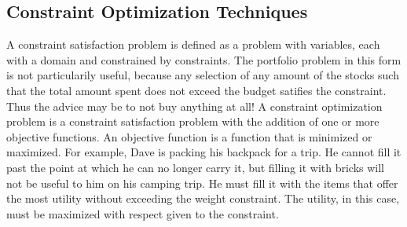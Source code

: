 \documentclass{article}
\begin{document}
    \subsection{Constraint Optimization Techniques}
    A constraint satisfaction problem is defined as a problem with variables, each with a domain and constrained by constraints. The portfolio
    problem in this form is not particularily useful, because any selection of any amount of the stocks such that the total amount spent does 
    not exceed the budget satifies the constraint. Thus the advice may be to not buy anything at all! A constraint optimization problem is a 
    constraint satisfaction problem with the addition of one or more objective functions. An objective function is a function that is minimized
    or maximized. For example, Dave is packing his backpack for a trip. He cannot fill it past the point at which he can no longer 
    carry it, but filling it with bricks will not be useful to him on his camping trip. He must fill it with the items that offer the most utility
    without exceeding the weight constraint. The utility, in this case, must be maximized with respect given to the constraint. 
\end{document}
